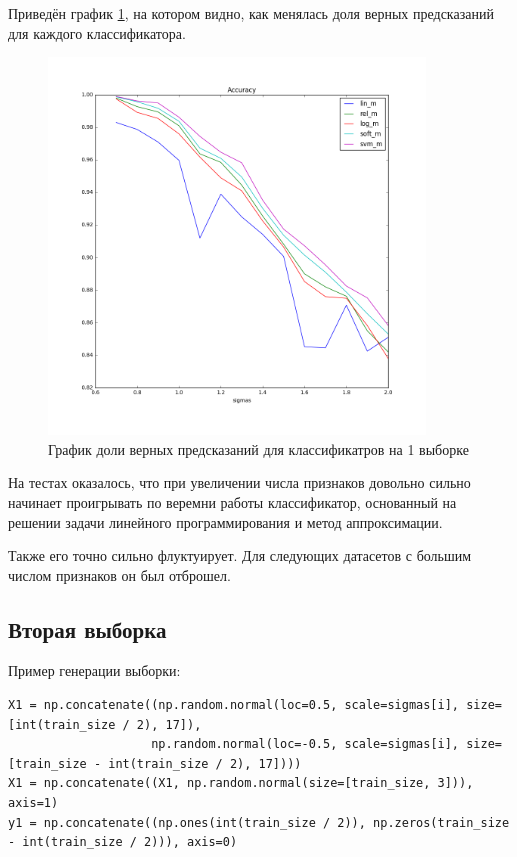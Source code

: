 \documentclass[a4paper]{article}
\begin{document}
Приведён график \ref{pic:im1}, на котором видно, как менялась доля верных предсказаний для каждого классификатора.

\begin{figure}[H]
\centering
\includegraphics[width=10cm]{first_dataset}
\caption{График доли верных предсказаний для классификатров на 1 выборке}
\label{pic:im1}
\end{figure}

На тестах оказалось, что при увеличении числа признаков довольно сильно начинает проигрывать по веремни работы классификатор, основанный на решении задачи линейного программирования и метод аппроксимации.

Также его точно сильно флуктуирует. Для следующих датасетов с большим числом признаков он был отброшел.

\subsection{Вторая выборка}

Пример генерации выборки:

\begin{lstlisting}
X1 = np.concatenate((np.random.normal(loc=0.5, scale=sigmas[i], size=[int(train_size / 2), 17]),
                    np.random.normal(loc=-0.5, scale=sigmas[i], size=[train_size - int(train_size / 2), 17]))) 
X1 = np.concatenate((X1, np.random.normal(size=[train_size, 3])), axis=1)
y1 = np.concatenate((np.ones(int(train_size / 2)), np.zeros(train_size - int(train_size / 2))), axis=0)
\end{lstlisting}
\end{document}
